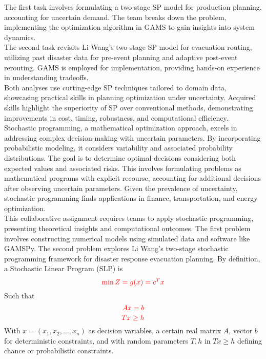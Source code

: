 \documentclass[a4paper]{article}
\begin{document}
	The first task involves formulating a two-stage SP model for production planning, accounting for uncertain demand. The team breaks down the problem, implementing the optimization algorithm in GAMS to gain insights into system dynamics.\\
	
	The second task revisits Li Wang’s two-stage SP model for evacuation routing, utilizing past disaster data for pre-event planning and adaptive post-event rerouting. GAMS is employed for implementation, providing hands-on experience in understanding tradeoffs.\\
	
	Both analyses use cutting-edge SP techniques tailored to domain data, showcasing practical skills in planning optimization under uncertainty. Acquired skills highlight the superiority of SP over conventional methods, demonstrating improvements in cost, timing, robustness, and computational efficiency.\\
	
	Stochastic programming, a mathematical optimization approach, excels in addressing complex decision-making with uncertain parameters. By incorporating probabilistic modeling, it considers variability and associated probability distributions. The goal is to determine optimal decisions considering both expected values and associated risks. This involves formulating problems as mathematical programs with explicit recourse, accounting for additional decisions after observing uncertain parameters. Given the prevalence of uncertainty, stochastic programming finds applications in finance, transportation, and energy optimization.\\
	
	This collaborative assignment requires teams to apply stochastic programming, presenting theoretical insights and computational outcomes. The first problem involves constructing numerical models using simulated data and software like GAMSPy. The second problem explores Li Wang’s two-stage stochastic programming framework for disaster response evacuation planning.
	By definition, a Stochastic Linear Program (SLP) is
	\[
	\textcolor{red}{\min Z = g(x) = c^T x}
	\]
	Such that 
	\[
	\textcolor{red}{Ax = b}
	\]
	\[
	\textcolor{red}{Tx \geq h}
	\]
	With \(x = (x_1, x_2, \ldots, x_n)\) as decision variables, a certain real matrix \(A\), vector \(b\) for deterministic constraints, and with random parameters \(T, h\) in \(Tx \geq h\) defining chance or probabilistic constraints.
	
\end{document}
